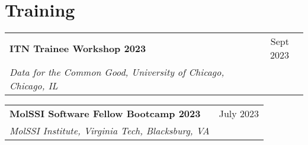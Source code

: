 \documentclass[a4paper,12pt]{article}
\begin{document}

\section{Training}
\begin{tabularx}{\linewidth}{ @{}l r@{} r@{} }
\textbf{ITN Trainee Workshop 2023} & \hfill \qquad \qquad \qquad \qquad \qquad \qquad Sept 2023 \\
\textit{Data for the Common Good, University of Chicago, Chicago, IL} & \\[3.75pt]


\end{tabularx}

\begin{tabularx}{\linewidth}{ @{}l r@{} }
\textbf{MolSSI Software Fellow Bootcamp 2023} & \hfill \qquad \qquad \qquad \qquad \qquad \qquad  \qquad \qquad \qquad \quad July 2023 \\
\textit{MolSSI Institute, Virginia Tech, Blacksburg, VA} & \\ %
\end{tabularx}
\end{document}

